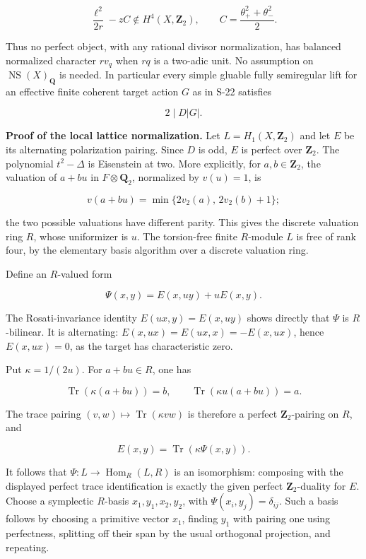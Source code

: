\[
 \frac{\ell^2}{2r}-zC\notin H^4(X,\mathbf Z_2),\qquad
 C=\frac{\theta_+^2+\theta_-^2}{2}.
 \tag{E806.13}
\]

Thus no perfect object, with any rational divisor normalization, has
balanced normalized character \(r v_q\) when \(rq\) is a two-adic unit.
No assumption on \(\operatorname{NS}(X)_{\mathbf Q}\) is needed. In
particular every simple gluable fully semiregular lift for an effective
finite coherent target action \(G\) as in S-22 satisfies

\[
 2\mid D|G|.
 \tag{E806.14}
\]

\textbf{Proof of the local lattice normalization.} Let
\(L=H_1(X,\mathbf Z_2)\) and let \(E\) be its alternating polarization
pairing. Since \(D\) is odd, \(E\) is perfect over \(\mathbf Z_2\). The
polynomial \(t^2-\Delta\) is Eisenstein at two. More explicitly, for
\(a,b\in\mathbf Z_2\), the valuation of \(a+bu\) in
\(F\otimes\mathbf Q_2\), normalized by \(v(u)=1\), is

\[
 v(a+bu)=\min\{2v_2(a),\,2v_2(b)+1\};
\]

the two possible valuations have different parity. This gives the
discrete valuation ring \(R\), whose uniformizer is \(u\). The
torsion-free finite \(R\)-module \(L\) is free of rank four, by the
elementary basis algorithm over a discrete valuation ring.

Define an \(R\)-valued form

\[
 \Psi(x,y)=E(x,uy)+uE(x,y).
 \tag{E806.15}
\]

The Rosati-invariance identity \(E(ux,y)=E(x,uy)\) shows directly that
\(\Psi\) is \(R\)-bilinear. It is alternating:
\(E(x,ux)=E(ux,x)=-E(x,ux)\), hence \(E(x,ux)=0\), as the target has
characteristic zero.

Put \(\kappa=1/(2u)\). For \(a+bu\in R\), one has

\[
 \operatorname{Tr}(\kappa(a+bu))=b,\qquad
 \operatorname{Tr}(\kappa u(a+bu))=a.
\]

The trace pairing \((v,w)\mapsto\operatorname{Tr}(\kappa vw)\) is
therefore a perfect \(\mathbf Z_2\)-pairing on \(R\), and

\[
 E(x,y)=\operatorname{Tr}(\kappa\Psi(x,y)).
\]

It follows that \(\Psi:L\longrightarrow\operatorname{Hom}_R(L,R)\) is an
isomorphism: composing with the displayed perfect trace identification
is exactly the given perfect \(\mathbf Z_2\)-duality for \(E\). Choose a
symplectic \(R\)-basis \(x_1,y_1,x_2,y_2\), with
\(\Psi(x_i,y_j)=\delta_{ij}\). Such a basis follows by choosing a
primitive vector \(x_1\), finding \(y_1\) with pairing one using
perfectness, splitting off their span by the usual orthogonal
projection, and repeating.

